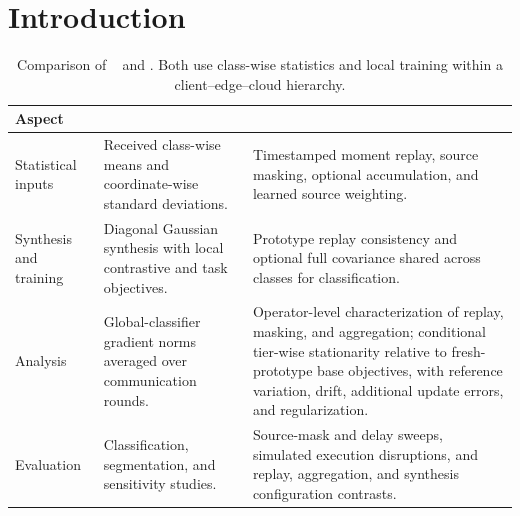 \section{Introduction}
\label{sec:introduction}

\begin{table}[t]
\centering
\footnotesize
\caption{Comparison of \hsfp{}~\cite{tran2026h} and \ehsfp{}. Both use class-wise statistics and local training within a client--edge--cloud hierarchy.}
\label{tab:extension_comparison}
\setlength{\tabcolsep}{3pt}
\renewcommand{\arraystretch}{1.08}
\begin{tabular}{@{}p{}p{}p{}@{}}
\toprule
Aspect & \hsfp{} & \ehsfp{} \\
\midrule
Statistical inputs
& Received class-wise means and coordinate-wise standard deviations.
& Timestamped moment replay, source masking, optional accumulation, and learned source weighting. \\
\addlinespace
Synthesis and training
& Diagonal Gaussian synthesis with local contrastive and task objectives.
& Prototype replay consistency and optional full covariance shared across classes for classification. \\
\addlinespace
Analysis
& Global-classifier gradient norms averaged over communication rounds.
& Operator-level characterization of replay, masking, and aggregation; conditional tier-wise stationarity relative to fresh-prototype base objectives, with reference variation, drift, additional update errors, and regularization. \\
\addlinespace
Evaluation
& Classification, segmentation, and sensitivity studies.
& Source-mask and delay sweeps, simulated execution disruptions, and replay, aggregation, and synthesis configuration contrasts. \\
\bottomrule
\end{tabular}
\end{table}

